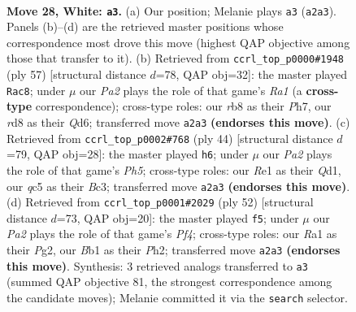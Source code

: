 \documentclass[11pt]{article}
\begin{document}
\clearpage

\begin{figure}[p]\centering
\begin{subfigure}{0.46\textwidth}\centering
\resizebox{\linewidth}{!}{%
\newchessgame
\chessboard[
  setfen={1r1r4/pp3pk1/8/2q4p/b3PQ2/6Pp/PP3P2/RB2R1K1 w - - 1 28},
  showmover=false,
  pgfstyle=straightmove, color=movearrow, markmove={a2-a3}
]}
\caption{}
\end{subfigure}\hfill
\begin{subfigure}{0.46\textwidth}\centering
\resizebox{\linewidth}{!}{%
\newchessgame
\chessboard[
  setfen={r3r1k1/1pp3pp/3q4/p2bpQ2/P6P/4P1P1/1B3P2/R2R2K1 b - - 4 29},
  showmover=false,
  pgfstyle=straightmove, color=movearrow, markmove={a8-c8}
]}
\caption{}
\end{subfigure}
\\[4pt]
\begin{subfigure}{0.46\textwidth}\centering
\resizebox{\linewidth}{!}{%
\newchessgame
\chessboard[
  setfen={1r5r/p4kpp/2p1p3/3q1pbP/8/2BP3R/PP3P2/R2Q1K2 w - - 0 23},
  showmover=false,
  pgfstyle=straightmove, color=movearrow, markmove={h5-h6}
]}
\caption{}
\end{subfigure}\hfill
\begin{subfigure}{0.46\textwidth}\centering
\resizebox{\linewidth}{!}{%
\newchessgame
\chessboard[
  setfen={rr4k1/4bppp/8/4P3/p1qBQP2/2P5/6PP/R4R1K w - - 4 27},
  showmover=false,
  pgfstyle=straightmove, color=movearrow, markmove={f4-f5}
]}
\caption{}
\end{subfigure}
\caption{\textbf{Move 28, White: \texttt{a3}.} (a) Our position; Melanie plays \texttt{a3} (\texttt{a2a3}). Panels (b)--(d) are the retrieved master positions whose correspondence most drove this move (highest QAP objective among those that transfer to it). (b) Retrieved from \texttt{ccrl\_top\_p0000\#1948} (ply 57) [structural distance $d$=78, QAP obj=32]: the master played \texttt{Rac8}; under $\mu$ our \emph{Pa2} plays the role of that game's \emph{Ra1} (a \textbf{cross-type} correspondence); cross-type roles: our \emph{r}b8 as their \emph{P}h7, our \emph{r}d8 as their \emph{Q}d6; transferred move \texttt{a2a3} \textbf{(endorses this move)}. (c) Retrieved from \texttt{ccrl\_top\_p0002\#768} (ply 44) [structural distance $d$=79, QAP obj=28]: the master played \texttt{h6}; under $\mu$ our \emph{Pa2} plays the role of that game's \emph{Ph5}; cross-type roles: our \emph{R}e1 as their \emph{Q}d1, our \emph{q}c5 as their \emph{B}c3; transferred move \texttt{a2a3} \textbf{(endorses this move)}. (d) Retrieved from \texttt{ccrl\_top\_p0001\#2029} (ply 52) [structural distance $d$=73, QAP obj=20]: the master played \texttt{f5}; under $\mu$ our \emph{Pa2} plays the role of that game's \emph{Pf4}; cross-type roles: our \emph{R}a1 as their \emph{P}g2, our \emph{B}b1 as their \emph{P}h2; transferred move \texttt{a2a3} \textbf{(endorses this move)}. Synthesis: 3 retrieved analogs transferred to \texttt{a3} (summed QAP objective 81, the strongest correspondence among the candidate moves); Melanie committed it via the \texttt{search} selector.}
\label{fig:thought-m54}
\end{figure}
\end{document}
